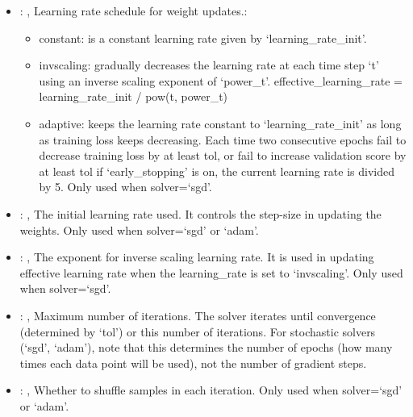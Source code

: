 \begin{itemize}
    \item {}: , 
      Learning rate schedule for weight updates.:
      \begin{itemize}                                                   \item constant: is a
      constant learning rate given by `learning\_rate\_init'.
      \item invscaling: gradually decreases the learning rate at each time step `t' using
      an inverse scaling exponent of `power\_t'. effective\_learning\_rate = learning\_rate\_init /
      pow(t, power\_t)                                                   \item adaptive: keeps the
      learning rate constant to `learning\_rate\_init' as long as training
      loss keeps decreasing. Each time two consecutive epochs fail to decrease training loss by at
      least tol, or fail to increase validation score by at least tol if `early\_stopping' is on,
      the current learning rate is divided by 5. Only used when solver=`sgd'.
      \end{itemize}

    \item {}: , 
      The initial learning rate used. It controls the step-size in updating the weights.
      Only used when solver=`sgd' or `adam'.

    \item {}: , 
      The exponent for inverse scaling learning rate. It is used in updating effective
      learning rate when the learning\_rate is set to `invscaling'. Only used when solver=`sgd'.

    \item {}: , 
      Maximum number of iterations. The solver iterates until convergence
      (determined by `tol') or this number of iterations. For stochastic solvers (`sgd', `adam'),
      note that this determines the number of epochs (how many times each data point will be used),
      not the number of gradient steps.

    \item {}: , 
      Whether to shuffle samples in each iteration. Only used when solver=`sgd' or `adam'.


\end{itemize}
